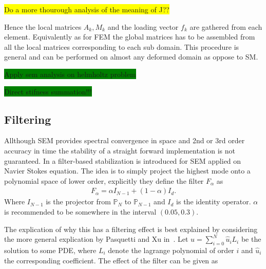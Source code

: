\colorbox{yellow}{Do a more thourough analysis of the meaning of J??}

Hence the local matrices $A_k,M_k$ and the loading vector $f_k$ 
are gathered from each element.
Equivalently as for FEM the global matrices has to be assembled
from all the local matrices corresponding to each sub domain. This procedure is general and can 
be performed on almost any deformed domain as oppose to SM. 

\colorbox{green}{Apply sem analysis on helmholtz problem}


\colorbox{green}{Direct stifness summation!!!}


\subsection{Filtering}
Allthough SEM provides spectral convergence in space and 2nd or 3rd order accuracy in time the stability of a straight forward
implementation is not guaranteed. In \cite{FischerMullen} a filter-based stabilization is introduced for SEM applied on 
Navier Stokes equation. The idea is to simply project the highest mode onto a polynomial space of lower order, 
explicitly they define the filter $F_{\alpha}$ as 
%
\begin{align}
    F_{\alpha}= \alpha I_{N-1}  + (1-\alpha) I_d.
    \label{eq:filter}
\end{align}
%
Where $I_{N-1}$ is the projector from $\mathbb{P}_N$ to $\mathbb{P}_{N-1}$ and $ I_d$ is the identity operator.
$\alpha$ is recommended to be somewhere in the interval $(0.05,0.3)$.

The explication of why this has a filtering effect is best explained by considering the 
more general explication by Pasquetti and Xu in~\cite{Pasquetti}. 
Let $u = \sum_{i=0}^{N} \hat{u}_i L_i$ be the solution to some PDE, where $L_i$ denote the lagrange
polynomial of order $i$ and $\hat{u}_i$ the corresponding coefficient. The effect of the filter
can be given as 
%


